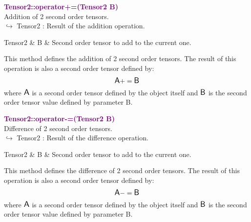 \textcolor{purple}{\textbf{Tensor2::operator+=(Tensor2 B)}}\label{Tensor2::operator+=(Tensor2 B)}\\
Addition of 2 second order tensors.\\ \hspace*{10mm}$\hookrightarrow$ Tensor2 : Result of the addition operation.

\begin{tcolorbox}[width=\textwidth,myArgs,tabularx={ll|R}]
Tensor2 & B & Second order tensor to add to the current one.
\end{tcolorbox}

This method defines the addition of 2 second order tensors.
The result of this operation is also a second order tensor defined by:
\begin{equation*}
\mbox{\large\ensuremath{\mathsf{A}}} += \mbox{\large\ensuremath{\mathsf{B}}}
\end{equation*}
where $\mbox{\large\ensuremath{\mathsf{A}}}$ is a second order tensor defined by the object itself and $\mbox{\large\ensuremath{\mathsf{B}}}$ is the second order tensor value defined by parameter B.

\textcolor{purple}{\textbf{Tensor2::operator-=(Tensor2 B)}}\label{Tensor2::operator-=(Tensor2 B)}\\
Difference of 2 second order tensors.\\ \hspace*{10mm}$\hookrightarrow$ Tensor2 : Result of the difference operation.

\begin{tcolorbox}[width=\textwidth,myArgs,tabularx={ll|R}]
Tensor2 & B & Second order tensor to add to the current one.
\end{tcolorbox}

This method defines the difference of 2 second order tensors.
The result of this operation is also a second order tensor defined by:
\begin{equation*}
\mbox{\large\ensuremath{\mathsf{A}}} -= \mbox{\large\ensuremath{\mathsf{B}}}
\end{equation*}
where $\mbox{\large\ensuremath{\mathsf{A}}}$ is a second order tensor defined by the object itself and $\mbox{\large\ensuremath{\mathsf{B}}}$ is the second order tensor value defined by parameter B.

